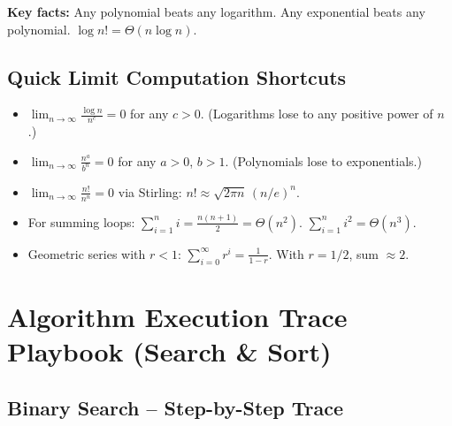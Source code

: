 \documentclass[12pt,portrait]{article}
\begin{document}
\textbf{Key facts:} Any polynomial beats any logarithm. Any exponential beats any polynomial. $\log n! = \Theta(n\log n)$.

\subsection{Quick Limit Computation Shortcuts}

\begin{itemize}[leftmargin=*]
    \item $\displaystyle\lim_{n\to\infty}\frac{\log n}{n^c} = 0$ for any $c > 0$. (Logarithms lose to any positive power of $n$.)
    \item $\displaystyle\lim_{n\to\infty}\frac{n^a}{b^n} = 0$ for any $a > 0$, $b > 1$. (Polynomials lose to exponentials.)
    \item $\displaystyle\lim_{n\to\infty}\frac{n!}{n^n} = 0$ via Stirling: $n! \approx \sqrt{2\pi n}\,(n/e)^n$.
    \item For summing loops: $\sum_{i=1}^{n} i = \frac{n(n+1)}{2} = \Theta(n^2)$. $\sum_{i=1}^{n} i^2 = \Theta(n^3)$.
    \item Geometric series with $r<1$: $\sum_{i=0}^{\infty} r^i = \frac{1}{1-r}$. With $r=1/2$, sum $\approx 2$.
\end{itemize}

\section{Algorithm Execution Trace Playbook (Search \& Sort)}
\label{sec:sorting}

\subsection{Binary Search -- Step-by-Step Trace}
\label{sec:binary_search}
\end{document}
